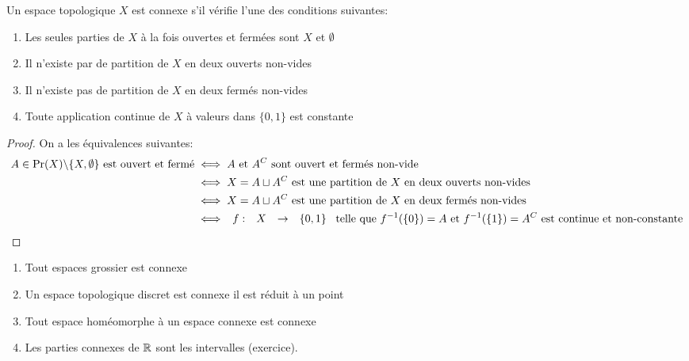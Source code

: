 \documentclass[]{report}
\begin{document}
    \begin{dfprop}{}{}
        Un espace topologique $X$ est connexe s'il vérifie l'une des conditions suivantes:
        \begin{enumerate}
            \item Les seules parties de $X$ à la fois ouvertes et fermées sont $X$ et $\emptyset$
            \item Il n'existe par de partition de $X$ en deux ouverts non-vides
            \item Il n'existe pas de partition de $X$ en deux fermés non-vides
            \item Toute application continue de $X$ à valeurs dans $\{0,1\}$ est constante
        \end{enumerate}
    \end{dfprop}

    \begin{proof}
        On a les équivalences suivantes:
        \begin{align*}
            A\in\Pr(X)\backslash\{X,\emptyset\}\text{ est ouvert et fermé}&\iff\text{$A$ et $A^C$ sont ouvert et fermés non-vide}\\
            &\iff X=A\sqcup A^C\text{ est une partition de $X$ en deux ouverts non-vides}\\
            &\iff X=A\sqcup A^C\text{ est une partition de $X$ en deux fermés non-vides}\\
            &\iff \begin{array}{ccccc} f : & X & \to & \{0,1\} \end{array}\text{ telle que }f^{-1}(\{0\})=A\text{ et }f^{-1}(\{1\})=A^C\text{ est continue et non-constante}
        \end{align*}
    \end{proof}

    \begin{ex}{}{}
        \begin{enumerate}
            \item Tout espaces grossier est connexe
            \item Un espace topologique discret est connexe \ssi il est réduit à un point
            \item Tout espace homéomorphe à un espace connexe est connexe
            \item Les parties connexes de $\mathbb{R}$ sont les intervalles (exercice).
        \end{enumerate}
    \end{ex}
\end{document}
